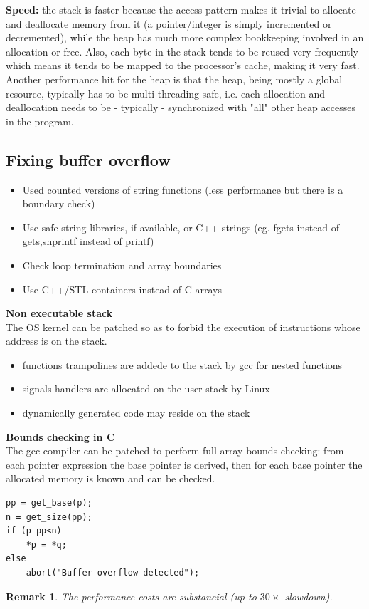 \documentclass[10pt,a4paper]{article}
\newtheorem{remark}{Remark}
\begin{document}
\textbf{Speed:} the stack is faster because the access pattern makes it trivial to allocate and deallocate memory from it (a pointer/integer is simply incremented or decremented), while the heap has much more complex bookkeeping involved in an allocation or free. Also, each byte in the stack tends to be reused very frequently which means it tends to be mapped to the processor's cache, making it very fast. Another performance hit for the heap is that the heap, being mostly a global resource, typically has to be multi-threading safe, i.e. each allocation and deallocation needs to be - typically - synchronized with "all" other heap accesses in the program.

\subsection{Fixing buffer overflow}
\begin{itemize}
\item Used counted versions of string functions (less performance but there is a boundary check)
\item Use safe string libraries, if available, or C++ strings (eg. fgets instead of gets,snprintf instead of printf)
\item Check loop termination and array boundaries
\item Use C++/STL containers instead of C arrays
\end{itemize}
\textbf{Non executable stack}\\
The OS kernel can be patched so as to forbid the execution of instructions whose address is on the stack.
\begin{itemize}
\item functions trampolines are addede to the stack by gcc for nested functions
\item signals handlers are allocated on the user stack by Linux
\item dynamically generated code may reside on the stack
\end{itemize}
\textbf{Bounds checking in C}\\
The gcc compiler can be patched to perform full array bounds checking: from each pointer expression the base pointer is derived, then for each base pointer the allocated memory is known and can be checked.
\begin{verbatim}
pp = get_base(p);
n = get_size(pp);
if (p-pp<n)
	*p = *q;
else
	abort("Buffer overflow detected");
\end{verbatim}
\begin{remark}
The performance costs are substancial (up to $30\times$ slowdown).
\end{remark}
\end{document}
